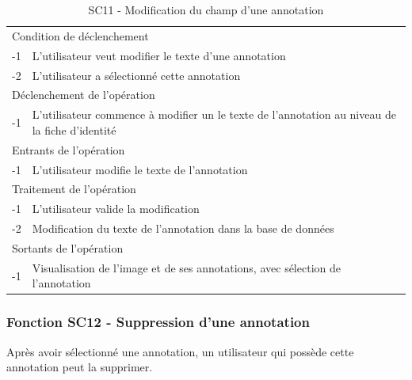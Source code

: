 \documentclass[a4paper]{article}
\begin{document}
\begin{table}[H]
  \centering
   \small
	\begin{tabular}{|c|p{12cm}|}
   		\hline
   			\rowcolor{lightgray}\multicolumn{2}{|c|}{\textbf{SC11 - Modification du champ d’une annotation}} \\
   		\hline
   			\multicolumn{2}{|l|}{Condition de d\'eclenchement} \\
   		\hline
   			-1 & L’utilisateur veut modifier le texte d'une annotation\\
			-2 & L’utilisateur a sélectionné cette annotation\\
   		\hline
   			\multicolumn{2}{|l|}{D\'eclenchement de l'op\'eration} \\
   		\hline
   			-1 & L’utilisateur commence à modifier un le texte de l'annotation au niveau de la fiche d'identité\\
   		\hline
   			\multicolumn{2}{|l|}{Entrants de l'op\'eration} \\
   		\hline
   			-1 & L’utilisateur modifie le texte de l'annotation\\
   		\hline
   			\multicolumn{2}{|l|}{Traitement de l'op\'eration} \\
  		\hline
   			-1 & L’utilisateur valide la modification\\
            -2 & Modification du texte de l'annotation dans la base de données\\
   		\hline
   			\multicolumn{2}{|l|}{Sortants de l'op\'eration} \\
   		\hline
   			-1 & Visualisation de l’image et de ses annotations, avec sélection de l’annotation\\
   		\hline
	\end{tabular}
  \caption{SC11 - Modification du champ d’une annotation}
  \normalsize
  \label{tab:modification_champ_annotation}
\end{table}

\subsubsection{Fonction SC12 - Suppression d'une annotation}
Après avoir sélectionné une annotation, un utilisateur qui possède cette annotation peut la supprimer.\\
\end{document}
